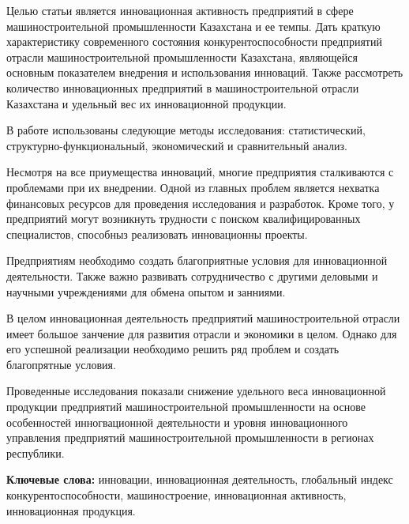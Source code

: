 Целью статьи является инновационная активность предприятий в сфере
машиностроительной промышленности Казахстана и ее темпы. Дать краткую
характеристику современного состояния конкурентоспособности предприятий
отрасли машиностроительной промышленности Казахстана, являющейся
основным показателем внедрения и использования инноваций. Также
рассмотреть количество инновационных предприятий в машиностроительной
отрасли Казахстана и удельный вес их инновационной продукции.

В работе использованы следующие методы исследования: статистический,
структурно-функциональный, экономический и сравнительный анализ.

Несмотря на все приумещества инноваций, многие предприятия сталкиваются
с проблемами при их внедрении. Одной из главных проблем является
нехватка финансовых ресурсов для проведения исследования и разработок.
Кроме того, у предприятий могут возникнуть трудности с поиском
квалифицированных специалистов, способныз реализовать инновационны
проекты.

Предприятиям необходимо создать благоприятные условия для инновационной
деятельности. Также важно развивать сотрудничество с другими деловыми и
научными учреждениями для обмена опытом и занниями.

В целом инновационная деятельность предприятий машиностроительной
отрасли имеет большое занчение для развития отрасли и экономики в целом.
Однако для его успешной реализации необходимо решить ряд проблем и
создать благопрятные условия.

Проведенные исследования показали снижение удельного веса инновационной
продукции предприятий машиностроительной промышленности на основе
особенностей инногвационной деятельности и уровня инновационного
управления предприятий машиностроительной промышленности в регионах
республики.

{\bfseries Ключевые слова:} инновации, инновационная деятельность,
глобальный индекс конкурентоспособности, машиностроение, инновационная
активность, инновационная продукция.

